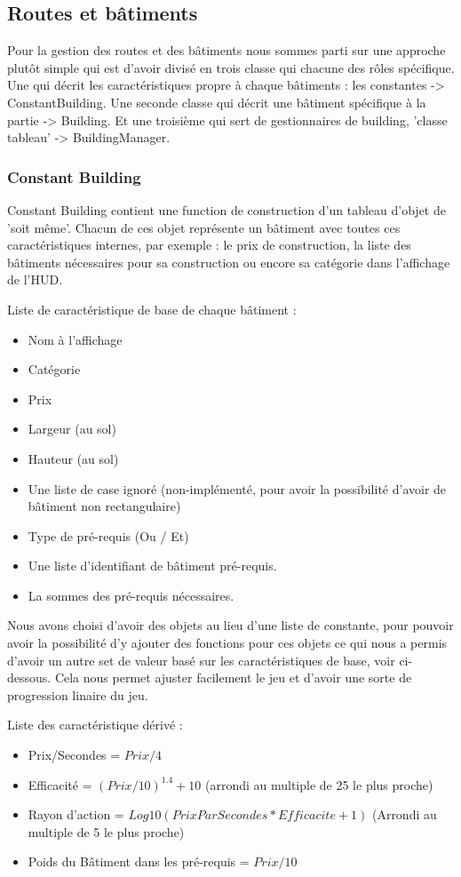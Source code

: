 \documentclass[a4paper,10pt,openany,oneside]{report}
\begin{document}
\subsection{Routes et bâtiments}
Pour la gestion des routes et des bâtiments nous sommes parti sur une approche plutôt simple qui est d'avoir divisé en trois classe qui chacune des rôles spécifique. Une qui décrit les caractéristiques propre à chaque bâtiments : les constantes -> ConstantBuilding. Une seconde classe qui décrit une bâtiment spécifique à la partie -> Building. Et une troisième qui sert de gestionnaires de building, 'classe tableau' -> BuildingManager. 

\subsubsection{Constant Building}
Constant Building contient une function de construction d'un tableau d'objet de 'soit même'. Chacun de ces objet représente un bâtiment avec toutes ces caractéristiques internes, par exemple : le prix de construction, la liste des bâtiments nécessaires pour sa construction ou encore sa catégorie dans l'affichage de l'HUD.

Liste de caractéristique de base de chaque bâtiment :
\begin{itemize}
	\item Nom à l'affichage
	\item Catégorie
	\item Prix
	\item Largeur (au sol)
	\item Hauteur (au sol)
	\item Une liste de case ignoré (non-implémenté, pour avoir la possibilité d'avoir de bâtiment non rectangulaire)
	\item Type de pré-requis (Ou / Et)
	\item Une liste d'identifiant de bâtiment pré-requis.
	\item La sommes des pré-requis nécessaires. 
\end{itemize}

Nous avons choisi d'avoir des objets au lieu d'une liste de constante, pour pouvoir avoir la possibilité d'y ajouter des fonctions pour ces objets ce qui nous a permis d'avoir un autre set de valeur basé sur les caractéristiques de base, voir ci-dessous. Cela nous permet ajuster facilement le jeu et d'avoir une sorte de progression linaire du jeu.

Liste des caractéristique dérivé :
\begin{itemize}
  \item Prix/Secondes = \(Prix / 4\)
  \item Efficacité = \((Prix/10)^{1.4} + 10\) (arrondi au multiple de 25 le plus proche)
  \item Rayon d'action = \(Log10(PrixParSecondes*Efficacite + 1)\) (Arrondi au multiple de 5 le plus proche)
  \item Poids du Bâtiment dans les pré-requis = \(Prix / 10\)
\end{itemize}
\end{document}
